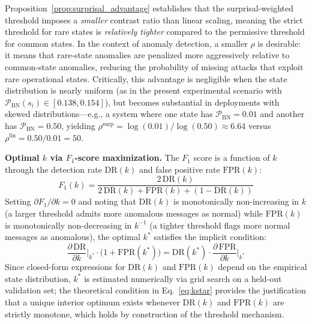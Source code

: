 \documentclass[manuscript,screen,review]{acmart}
\begin{document}
\begin{remark}
Proposition~\ref{prop:surprisal_advantage} establishes
that the surprisal-weighted threshold imposes a
\emph{smaller} contrast ratio than linear scaling,
meaning the strict threshold for rare states is
\emph{relatively tighter} compared to the permissive
threshold for common states. In the context of anomaly
detection, a smaller $\rho$ is desirable: it means that
rare-state anomalies are penalized more aggressively
relative to common-state anomalies, reducing the
probability of missing attacks that exploit rare
operational states. Critically, this advantage is
negligible when the state distribution is nearly uniform
(as in the present experimental scenario with
$\mathcal{P}_{\mathrm{BN}}(s_i) \in [0.138, 0.154]$),
but becomes substantial in deployments with skewed
distributions---e.g., a system where one state has
$\mathcal{P}_{\mathrm{BN}} = 0.01$ and another has
$\mathcal{P}_{\mathrm{BN}} = 0.50$, yielding
$\rho^{\mathrm{surp}} = \log(0.01)/\log(0.50) \approx 6.64$
versus $\rho^{\mathrm{lin}} = 0.50/0.01 = 50$.
\end{remark}

\textbf{Optimal $k$ via $F_1$-score maximization.}
The $F_1$ score is a function of $k$ through the
detection rate $\mathrm{DR}(k)$ and false positive
rate $\mathrm{FPR}(k)$:
\begin{equation}
F_1(k) = \frac{2\,\mathrm{DR}(k)}
{2\,\mathrm{DR}(k) + \mathrm{FPR}(k) +
(1 - \mathrm{DR}(k))}
\label{eq:f1_k}
\end{equation}
Setting $\partial F_1 / \partial k = 0$ and noting that
$\mathrm{DR}(k)$ is monotonically non-increasing in $k$
(a larger threshold admits more anomalous messages as
normal) while $\mathrm{FPR}(k)$ is monotonically
non-decreasing in $k^{-1}$ (a tighter threshold flags
more normal messages as anomalous), the optimal $k^*$
satisfies the implicit condition:
\begin{equation}
\frac{\partial\,\mathrm{DR}}{\partial k}\bigg|_{k^*}
\cdot \bigl(1 + \mathrm{FPR}(k^*)\bigr)
=
\mathrm{DR}(k^*) \cdot
\frac{\partial\,\mathrm{FPR}}{\partial k}\bigg|_{k^*}
\label{eq:kstar}
\end{equation}
Since closed-form expressions for $\mathrm{DR}(k)$ and
$\mathrm{FPR}(k)$ depend on the empirical state
distribution, $k^*$ is estimated numerically via grid
search on a held-out validation set; the theoretical
condition in Eq.~\eqref{eq:kstar} provides the
justification that a unique interior optimum exists
whenever $\mathrm{DR}(k)$ and $\mathrm{FPR}(k)$ are
strictly monotone, which holds by construction of the
threshold mechanism.
\end{document}
